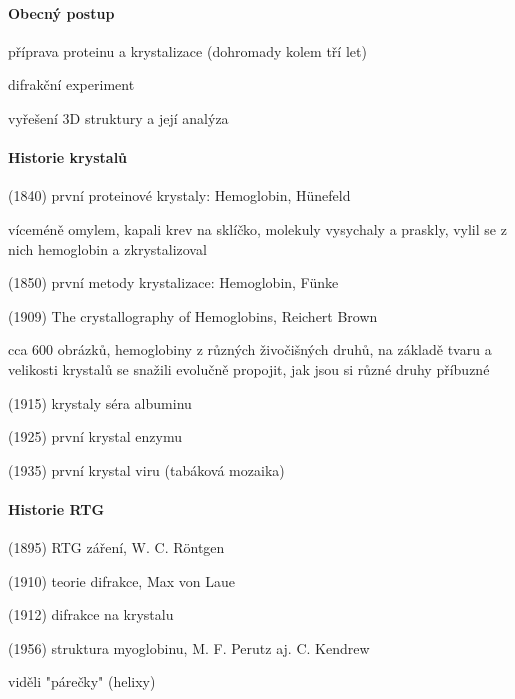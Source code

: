 \documentclass[DIV=8]{scrreprt}
\begin{document}
\paragraph{Obecný postup}
\begin{myEnumerate}[nosep]
    \item příprava proteinu a krystalizace (dohromady kolem tří let)
    \item difrakční experiment
    \item vyřešení 3D struktury a její analýza
\end{myEnumerate}



\paragraph{Historie krystalů}
\begin{myItemize}[nosep]
    \item (1840) první proteinové krystaly: Hemoglobin, Hünefeld
\begin{myItemize}[nosep]
    \item víceméně omylem, kapali krev na sklíčko, molekuly vysychaly a praskly, vylil se z nich hemoglobin a zkrystalizoval
\end{myItemize}

    \item (1850) první metody krystalizace: Hemoglobin, Fünke
    \item (1909) The crystallography of Hemoglobins, Reichert Brown
\begin{myItemize}[nosep]
    \item cca 600 obrázků, hemoglobiny z různých živočišných druhů, na základě tvaru a velikosti krystalů se snažili evolučně propojit, jak jsou si různé druhy příbuzné
\end{myItemize}

    \item (1915) krystaly séra albuminu
    \item (1925) první krystal enzymu
    \item (1935) první krystal viru (tabáková mozaika)
\end{myItemize}



\paragraph{Historie RTG}
\begin{myItemize}[nosep]
    \item (1895) RTG záření, W. C. Röntgen
    \item (1910) teorie difrakce, Max von Laue
    \item (1912) difrakce na krystalu
    \item (1956) struktura myoglobinu, M. F. Perutz aj. C. Kendrew
\begin{myItemize}[nosep]
    \item viděli "párečky" (helixy)
\end{myItemize}

\end{myItemize}
\end{document}
